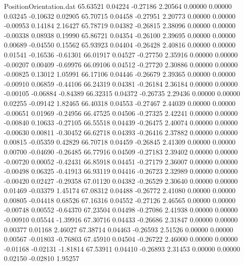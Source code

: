 \begin{filecontents}{PositionOrientation.dat}
  65.63521    0.04224   -0.27186     2.20564    0.00000    0.00000    0.03245   -0.10632    0.02905
  65.70715    0.04458   -0.27951     2.20773    0.00000    0.00000   -0.00953    0.14184    2.16427
  65.78719    0.04382   -0.26815     2.38096    0.00000    0.00000   -0.00338    0.08938    0.19990
  65.86721    0.04354   -0.26100     2.39695    0.00000    0.00000    0.00689   -0.04550    0.15562
  65.93923    0.04404   -0.26428     2.40816    0.00000    0.00000    0.01541   -0.16536   -0.61301
  66.01917    0.04527   -0.27750     2.35916    0.00000    0.00000   -0.00207    0.00409   -0.69976
  66.09106    0.04512   -0.27720     2.30886    0.00000    0.00000   -0.00825    0.13012    1.05991
  66.17106    0.04446   -0.26679     2.39365    0.00000    0.00000   -0.00910    0.06859   -0.44106
  66.24319    0.04381   -0.26184     2.36184    0.00000    0.00000   -0.00105   -0.06884   -0.84389
  66.32315    0.04372   -0.26735     2.29436    0.00000    0.00000    0.02255   -0.09142    1.82465
  66.40318    0.04553   -0.27467     2.44039    0.00000    0.00000   -0.00651    0.01969   -0.24956
  66.47525    0.04506   -0.27325     2.42241    0.00000    0.00000   -0.00840    0.10633   -0.27105
  66.55518    0.04439   -0.26475     2.40074    0.00000    0.00000   -0.00630    0.00811   -0.30452
  66.62718    0.04393   -0.26416     2.37882    0.00000    0.00000    0.00815   -0.05359    0.42829
  66.70718    0.04459   -0.26845     2.41309    0.00000    0.00000    0.00700   -0.04690   -0.26485
  66.77916    0.04509   -0.27183     2.39402    0.00000    0.00000   -0.00720    0.00052   -0.42431
  66.85918    0.04451   -0.27179     2.36007    0.00000    0.00000   -0.00498    0.06325   -0.41913
  66.93119    0.04416   -0.26723     2.32989    0.00000    0.00000   -0.00420    0.02427   -0.29358
  67.01120    0.04382   -0.26529     2.30640    0.00000    0.00000    0.01469   -0.03379    1.45174
  67.08312    0.04488   -0.26772     2.41080    0.00000    0.00000    0.00805   -0.04418    0.68526
  67.16316    0.04552   -0.27126     2.46565    0.00000    0.00000   -0.00748    0.00552   -0.64370
  67.23504    0.04498   -0.27086     2.41938    0.00000    0.00000   -0.00910    0.05544   -1.39916
  67.30716    0.04433   -0.26686     2.31847    0.00000    0.00000    0.00377    0.01168    2.46027
  67.38714    0.04463   -0.26593     2.51526    0.00000    0.00000    0.00567   -0.01803   -0.76803
  67.45910    0.04504   -0.26722     2.46000    0.00000    0.00000   -0.01168   -0.02131   -1.81814
  67.53911    0.04410   -0.26893     2.31453    0.00000    0.00000    0.02150   -0.02810    1.95257

\end{filecontents}
